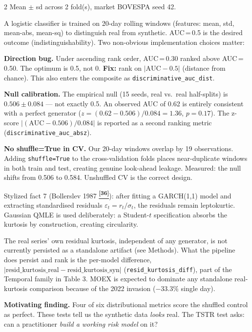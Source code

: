 \documentclass[10pt]{article}
\newcommand{\navybox}[2]{\begin{tcolorbox}[mybox={Navy}{LBg},title={#1}]#2\end{tcolorbox}}
\newcommand{\skybox}[2]{\begin{tcolorbox}[mybox={Sky}{BBg},title={#1}]#2\end{tcolorbox}}
\newcommand{\purplebox}[2]{\begin{tcolorbox}[mybox={Purple}{LBg},title={#1}]#2\end{tcolorbox}}
\newcommand{\tcite}[1]{%
  \hyperlink{R:#1}{\textsuperscript{\scriptsize\textbf{[#1]}}}}
\begin{document}
\begin{multicols}{2}
{\smallskip
{\small Mean $\pm$ sd across 2 fold(s), market BOVESPA seed 42.}}

\skybox{Discriminative AUC: Null Calibration and Direction Bug}{%
A logistic classifier is trained on 20-day rolling windows (features: mean, std, mean-abs, mean-sq) to distinguish real from synthetic. AUC\,=\,0.5 is the desired outcome (indistinguishability). Two non-obvious implementation choices matter:

\medskip
\textbf{Direction bug.} Under ascending rank order, AUC\,=\,0.30 ranked above AUC\,=\,0.50. The optimum is 0.5, not 0. \textbf{Fix:} rank on $|\text{AUC} - 0.5|$ (distance from chance). This also enters the composite as \texttt{discriminative\_auc\_dist}.

\medskip
\textbf{Null calibration.} The empirical null (15 seeds, real vs.\ real half-splits) is $0.506 \pm 0.084$ --- not exactly 0.5. An observed AUC of 0.62 is entirely consistent with a perfect generator ($z = (0.62 - 0.506)/0.084 = 1.36$, $p = 0.17$). The z-score $|(\text{AUC} - 0.506)/0.084|$ is reported as a second ranking metric (\texttt{discriminative\_auc\_absz}).

\medskip
\textbf{No shuffle=True in CV.} Our 20-day windows overlap by 19 observations. Adding \texttt{shuffle=True} to the cross-validation folds places near-duplicate windows in both train and test, creating genuine look-ahead leakage. Measured: the null shifts from 0.506 to 0.584. Unshuffled CV is the correct design.}

\columnbreak

\purplebox{Conditional Heavy Tails}{%
Stylized fact 7 (Bollerslev 1987\tcite{36}): after fitting a GARCH(1,1) model and extracting standardised residuals $\varepsilon_t = r_t / \sigma_t$, the residuals remain leptokurtic. Gaussian QMLE is used deliberately: a Student-$t$ specification absorbs the kurtosis by construction, creating circularity.

The real series' own residual kurtosis, independent of any generator, is not currently persisted as a standalone artifact (see Methods). What the pipeline does persist and rank is the per-model difference, $|\text{resid\_kurtosis\_real} - \text{resid\_kurtosis\_syn}|$ (\texttt{resid\_kurtosis\_diff}), part of the Temporal family in Table 3. MOEX is expected to dominate any standalone real-kurtosis comparison because of the 2022 invasion ($-33.3\%$ single day).}

\navybox{Downstream Utility: TSTR Protocol}{%
\textbf{Motivating finding.} Four of six distributional metrics score the shuffled control as perfect. These tests tell us the synthetic data \emph{looks} real. The TSTR test asks: can a practitioner \emph{build a working risk model} on it?

}
\end{multicols}
\end{document}
